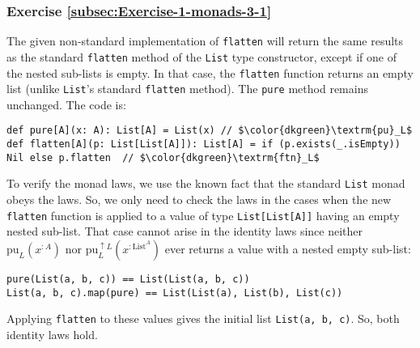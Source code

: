\subsubsection*{Exercise \ref{subsec:Exercise-1-monads-3-1}}

The
given non-standard implementation of \lstinline!flatten! will return
the same results as the standard \lstinline!flatten! method of the
\lstinline!List! type constructor, except if one of the nested sub-lists
is empty. In that case, the \lstinline!flatten! function returns
an empty list (unlike \lstinline!List!\textsf{'}s standard \lstinline!flatten!
method). The \lstinline!pure! method remains unchanged. The code
is:
\begin{lstlisting}[mathescape=true]
def pure[A](x: A): List[A] = List(x) // $\color{dkgreen}\textrm{pu}_L$
def flatten[A](p: List[List[A]]): List[A] = if (p.exists(_.isEmpty)) Nil else p.flatten  // $\color{dkgreen}\textrm{ftn}_L$
\end{lstlisting}

To verify the monad laws, we use the known fact that the standard
\lstinline!List! monad obeys the laws. So, we only need to check
the laws in the cases when the new \lstinline!flatten! function is
applied to a value of type \lstinline!List[List[A]]! having an empty
nested sub-list. That case cannot arise in the identity laws since
neither $\text{pu}_{L}(x^{:A})$ nor $\text{pu}_{L}^{\uparrow L}(x^{:\text{List}^{A}})$
ever returns a value with a nested empty sub-list:
\begin{lstlisting}
pure(List(a, b, c)) == List(List(a, b, c))
List(a, b, c).map(pure) == List(List(a), List(b), List(c))
\end{lstlisting}
Applying \lstinline!flatten! to these values gives the initial list
\lstinline!List(a, b, c)!. So, both identity laws hold.

